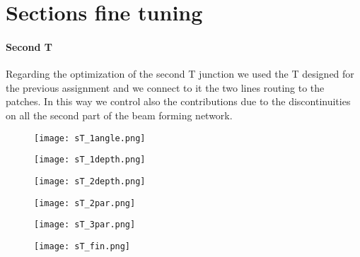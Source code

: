 \section{Sections fine tuning}

\paragraph{Second T}
Regarding the optimization of the second T junction we used the T designed for the previous assignment and we connect to it the two lines routing to the patches. In this way we control also the contributions due to the discontinuities on all the second part of the beam forming network.

\begin{figure}[H]
	\centering
	\texttt{[image: sT\_1angle.png]}
	\caption{}
	\label{sT_1angle}
\end{figure}
\begin{figure}[H]
	\centering
	\texttt{[image: sT\_1depth.png]}
	\caption{}
	\label{sT_1depth}
\end{figure}
\begin{figure}[H]
	\centering
	\texttt{[image: sT\_2depth.png]}
	\caption{}
	\label{sT_2depth}
\end{figure}
\begin{figure}[H]
	\centering
	\texttt{[image: sT\_2par.png]}
	\caption{}
	\label{sT_2par}
\end{figure}
\begin{figure}[H]
	\centering
	\texttt{[image: sT\_3par.png]}
	\caption{}
	\label{sT_3par}
\end{figure}
\begin{figure}[H]
	\centering
	\texttt{[image: sT\_fin.png]}
	\caption{}
	\label{sT_fin}
\end{figure}
